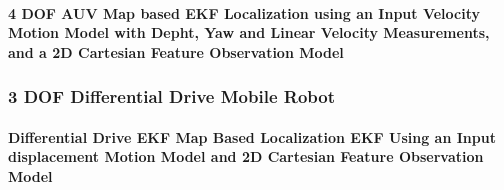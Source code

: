 \documentclass[letterpaper,10pt,english]{sphinxmanual}
\begin{document}
\paragraph{4 DOF AUV Map based EKF Localization using an Input Velocity Motion Model with Depht, Yaw and Linear Velocity Measurements, and  a 2D Cartesian Feature Observation Model}
\label{\detokenize{FEKFMBLocalization:dof-auv-map-based-ekf-localization-using-an-input-velocity-motion-model-with-depht-yaw-and-linear-velocity-measurements-and-a-2d-cartesian-feature-observation-model}}
\begin{figure}[htbp]
\centering

\noindent{}
\end{figure}


\subsubsection{3 DOF Differential Drive Mobile Robot}
\label{\detokenize{FEKFMBLocalization:dof-differential-drive-mobile-robot}}

\paragraph{Differential Drive EKF Map Based Localization EKF Using an Input displacement Motion Model and 2D Cartesian Feature Observation Model}
\label{\detokenize{FEKFMBLocalization:differential-drive-ekf-map-based-localization-ekf-using-an-input-displacement-motion-model-and-2d-cartesian-feature-observation-model}}
\begin{figure}[htbp]
\centering

\noindent{}
\end{figure}
\end{document}
